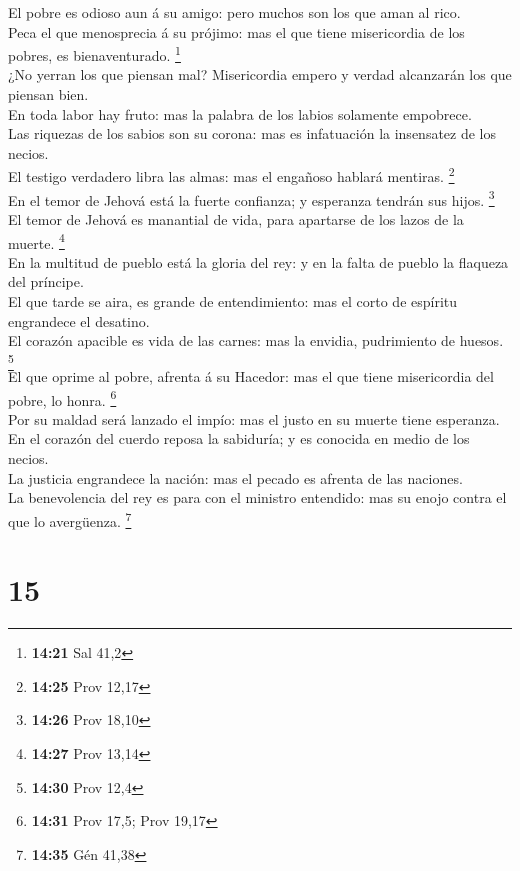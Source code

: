  El pobre es odioso aun á su amigo: pero muchos son los que
aman al rico.\\
 Peca el que menosprecia á su prójimo: mas el que tiene
misericordia de los pobres, es bienaventurado. \footnote{\textbf{14:21}
  Sal 41,2}\\
 ¿No yerran los que piensan mal? Misericordia empero y
verdad alcanzarán los que piensan bien.\\
 En toda labor hay fruto: mas la palabra de los labios
solamente empobrece.\\
 Las riquezas de los sabios son su corona: mas es
infatuación la insensatez de los necios.\\
 El testigo verdadero libra las almas: mas el engañoso
hablará mentiras. \footnote{\textbf{14:25} Prov 12,17}\\
 En el temor de Jehová está la fuerte confianza; y
esperanza tendrán sus hijos. \footnote{\textbf{14:26} Prov 18,10}\\
 El temor de Jehová es manantial de vida, para apartarse de
los lazos de la muerte. \footnote{\textbf{14:27} Prov 13,14}\\
 En la multitud de pueblo está la gloria del rey: y en la
falta de pueblo la flaqueza del príncipe.\\
 El que tarde se aira, es grande de entendimiento: mas el
corto de espíritu engrandece el desatino.\\
 El corazón apacible es vida de las carnes: mas la envidia,
pudrimiento de huesos. \footnote{\textbf{14:30} Prov 12,4}\\
 El que oprime al pobre, afrenta á su Hacedor: mas el que
tiene misericordia del pobre, lo honra. \footnote{\textbf{14:31} Prov
  17,5; Prov 19,17}\\
 Por su maldad será lanzado el impío: mas el justo en su
muerte tiene esperanza.\\
 En el corazón del cuerdo reposa la sabiduría; y es
conocida en medio de los necios.\\
 La justicia engrandece la nación: mas el pecado es afrenta
de las naciones.\\
 La benevolencia del rey es para con el ministro entendido:
mas su enojo contra el que lo avergüenza. \footnote{\textbf{14:35} Gén
  41,38}

\hypertarget{section-14}{%
\section{15}\label{section-14}}

